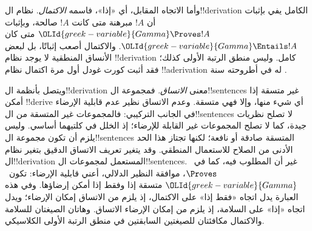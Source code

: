 \documentclass[../../../include/open-logic-section]{subfiles}
\begin{document}
وأما الاتجاه المقابل، أي «إذا»، فاسمه \emph{الاكتمال}. نظام ال!!{derivation} الكامل يفي بإثبات أن $!A$ مبرهنة متى كانت $!A$ صالحة، وبإثبات
${\OLId{greek-variable}{Gamma}} \Proves !A$ متى كان ${\OLId{greek-variable}{Gamma}} \Entails !A$.
والاكتمال أصعب إثباتًا، بل لبعض الأنساق المنطقية لا يوجد نظام
!!{derivation} كامل. وليس منطق الرتبة الأولى كذلك؛ فقد أثبت كورت غودل أول مرة اكتمال نظام
!!a{derivation} له في أطروحته سنة .

ويتصل بأنظمة ال!!{derivation} معنى \emph{الاتساق}. فمجموعة ال!!{sentence}s غير متسقة إذا أمكن
!!{derive} أي شيء منها، وإلا فهي متسقة. وعدم الاتساق نظير عدم قابلية الإرضاء في الجانب التركيبي: فالمجموعات غير المتسقة من ال!!{sentence}s لا تصلح نظريات جيدة، كما لا تصلح المجموعات غير القابلة للإرضاء؛ إذ الخلل في كلتيهما أساسي. وليس يلزم أن تكون مجموعة ال!!{sentence}s المتسقة صادقة أو نافعة؛ لكنها تجتاز هذا الحد الأدنى من الصلاح للاستعمال المنطقي.
وقد يتغير تعريف الاتساق الدقيق بتغير نظام ال!!{derivation} المستعمل لمجموعات ال!!{sentence}s. غير أن المطلوب فيه، كما في~$\Proves$، موافقة النظير الدلالي، أعني قابلية الإرضاء: تكون~${\OLId{greek-variable}{Gamma}}$ متسقة إذا وفقط إذا أمكن إرضاؤها. وفي هذه العبارة يدل اتجاه «فقط إذا» على الاكتمال، إذ يلزم من الاتساق إمكان الإرضاء؛ ويدل اتجاه «إذا» على السلامة، إذ يلزم من إمكان الإرضاء الاتساق. وهاتان الصيغتان للسلامة والاكتمال مكافئتان للصيغتين السابقتين في منطق الرتبة الأولى الكلاسيكي.
\end{document}
